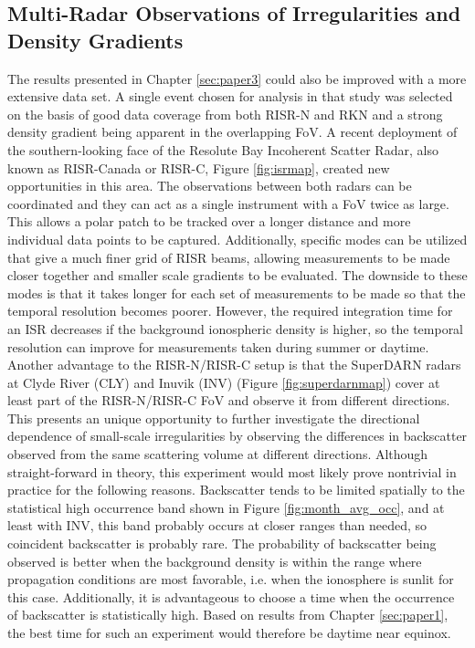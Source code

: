 \subsection{Multi-Radar Observations of Irregularities and Density Gradients}
\label{sec:fw_multiradar}
The results presented in Chapter \ref{sec:paper3} could also be improved with a more extensive data set.  A single event chosen for analysis in that study was selected on the basis of good data coverage from both RISR-N and RKN and a strong density gradient being apparent in the overlapping FoV.  A recent deployment of the southern-looking face of the Resolute Bay Incoherent Scatter Radar, also known as RISR-Canada or RISR-C, Figure \ref{fig:isrmap}, created new opportunities in this area.  The observations between both radars can be coordinated and they can act as a single instrument with a FoV twice as large.  This allows a polar patch to be tracked over a longer distance and more individual data points to be captured.  Additionally, specific modes can be utilized that give a much finer grid of RISR beams, allowing measurements to be made closer together and smaller scale gradients to be evaluated.  The downside to these modes is that it takes longer for each set of measurements to be made so that the temporal resolution becomes poorer.  However, the required integration time for an ISR decreases if the background ionospheric density is higher, so the temporal resolution can improve for measurements taken during summer or daytime.  Another advantage to the RISR-N/RISR-C setup is that the SuperDARN radars at Clyde River (CLY) and Inuvik (INV) (Figure \ref{fig:superdarnmap}) cover at least part of the RISR-N/RISR-C FoV and observe it from different directions.  This presents an unique opportunity to further investigate the directional dependence of small-scale irregularities by observing the differences in backscatter observed from the same scattering volume at different directions.  Although straight-forward in theory, this experiment would most likely prove nontrivial in practice for the following reasons.  Backscatter tends to be limited spatially to the statistical high occurrence band shown in Figure \ref{fig:month_avg_occ}, and at least with INV, this band probably occurs at closer ranges than needed, so coincident backscatter is probably rare.  The probability of backscatter being observed is better when the background density is within the range where propagation conditions are most favorable, i.e. when the ionosphere is sunlit for this case.  Additionally, it is advantageous to choose a time when the occurrence of backscatter is statistically high.  Based on results from Chapter \ref{sec:paper1}, the best time for such an experiment would therefore be daytime near equinox.

